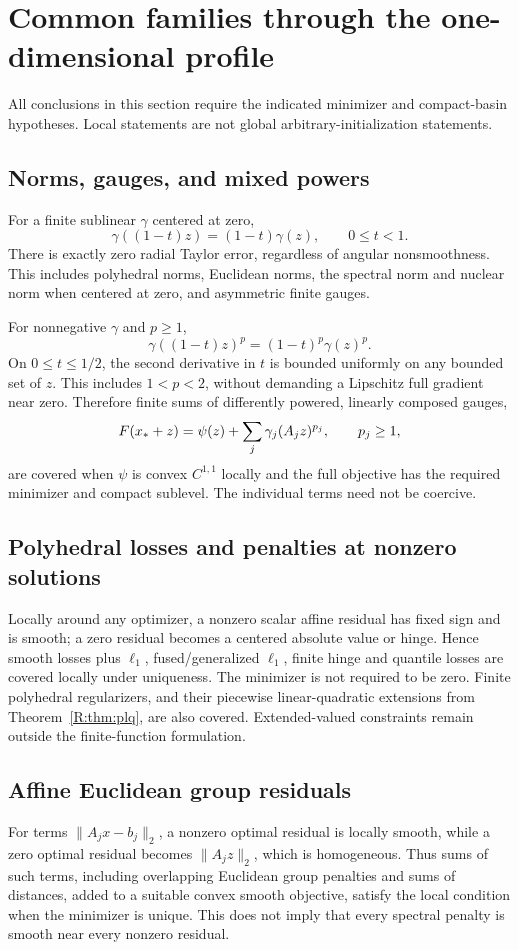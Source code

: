 \setcounter{section}{5}
\setcounter{theorem}{0}
\setcounter{equation}{8}
\section{Common families through the one-dimensional profile}
All conclusions in this section require the indicated minimizer and compact-basin hypotheses. Local statements are not global arbitrary-initialization statements.

\subsection{Norms, gauges, and mixed powers}
For a finite sublinear $\gamma$ centered at zero,
\[
 \gamma((1-t)z)=(1-t)\gamma(z),\qquad 0\le t<1.
\]
There is exactly zero radial Taylor error, regardless of angular nonsmoothness. This includes polyhedral norms, Euclidean norms, the spectral norm and nuclear norm when centered at zero, and asymmetric finite gauges.

For nonnegative $\gamma$ and $p\ge1$,
\[
 \gamma((1-t)z)^p=(1-t)^p\gamma(z)^p.
\]
On $0\le t\le1/2$, the second derivative in $t$ is bounded uniformly on any bounded set of $z$. This includes $1<p<2$, without demanding a Lipschitz full gradient near zero. Therefore finite sums of differently powered, linearly composed gauges,
\[
 F(x_*+z)=\psi(z)+\sum_j\gamma_j(A_jz)^{p_j},\qquad p_j\ge1,
\]
are covered when $\psi$ is convex $C^{1,1}$ locally and the full objective has the required minimizer and compact sublevel. The individual terms need not be coercive.

\subsection{Polyhedral losses and penalties at nonzero solutions}
Locally around any optimizer, a nonzero scalar affine residual has fixed sign and is smooth; a zero residual becomes a centered absolute value or hinge. Hence smooth losses plus $\ell_1$, fused/generalized $\ell_1$, finite hinge and quantile losses are covered locally under uniqueness. The minimizer is not required to be zero. Finite polyhedral regularizers, and their piecewise linear-quadratic extensions from Theorem~\ref{R:thm:plq}, are also covered. Extended-valued constraints remain outside the finite-function formulation.

\subsection{Affine Euclidean group residuals}
For terms $\|A_jx-b_j\|_2$, a nonzero optimal residual is locally smooth, while a zero optimal residual becomes $\|A_jz\|_2$, which is homogeneous. Thus sums of such terms, including overlapping Euclidean group penalties and sums of distances, added to a suitable convex smooth objective, satisfy the local condition when the minimizer is unique. This does not imply that every spectral penalty is smooth near every nonzero residual.

